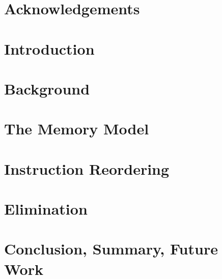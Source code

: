 \documentclass[12pt, TexShade, letterpaper]{report}
\begin{document}
\chapter*{Acknowledgements}
	\label{chap:acknowledgments}
    

 \tableofcontents\thispagestyle{plain}

 \listoffigures\thispagestyle{plain}

  \clearpage

    \chapter{Introduction}
    

    \chapter{Background}
    

    \chapter{The Memory Model}
    

    \chapter{Instruction Reordering}
    

    \chapter{Elimination} 
    

    \chapter{Conclusion, Summary, Future Work}
    
    
    \printbibliography
\end{document}
